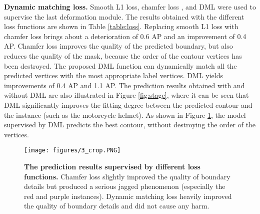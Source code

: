 \documentclass[10pt,twocolumn,letterpaper]{article}
\begin{document}
\textbf{Dynamic matching loss.} Smooth L1 loss, chamfer loss \cite{chamferloss}, and DML were used to supervise the last deformation module. The results obtained with the different loss functions are shown in Table \ref{table:loss}. Replacing smooth L1 loss with chamfer loss brings about a deterioration of 0.6 AP and an improvement of 0.4 AP. Chamfer loss improves the quality of the predicted boundary, but also reduces the quality of the mask, because the order of the contour vertices has been destroyed. The proposed DML function can dynamically match all the predicted vertices with the most appropriate label vertices. DML yields improvements of 0.4 AP and 1.1 AP. The prediction results obtained with and without DML are also illustrated in Figure \ref{fig:stage}, where it can be seen that DML significantly improves the fitting degree between the predicted contour and the instance (such as the motorcycle helmet). As shown in Figure \ref{fig:loss}, the model supervised by DML predicts the best contour, without destroying the order of the vertices. 
\begin{figure}[t]
  \centering
   \texttt{[image: figures/3\_crop.PNG]}\vspace{-2mm}
   \caption{\textbf{The prediction results supervised by different loss functions.} Chamfer loss slightly improved the quality of boundary details but produced a serious jagged phenomenon (especially the red and purple instances). Dynamic matching loss heavily improved the quality of boundary details and did not cause any harm.}\vspace{-6mm}
   \label{fig:loss}
\end{figure}
\end{document}
